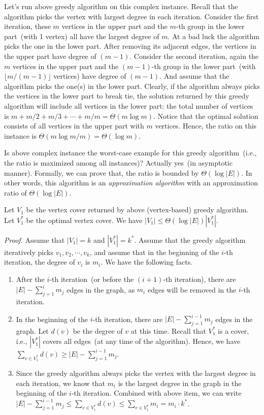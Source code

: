 Let's run above greedy algorithm on this complex instance.
Recall that the algorithm picks the vertex with largest degree in
each iteration. %
Consider the first iteration, 
these $m$ vertices in the upper part and the $m$-th group in the lower part~(with 1 vertex)
all have the largest degree of $m$.
At a bad luck the algorithm picks the one in the lower part.
After removing its adjacent edges, the vertices in the upper part
have degree of $(m-1)$.
Consider the second iteration,
again the $m$ vertices in the upper part and the $(m-1)$-th group in the lower part~(with $\lfloor m/(m-1) \rfloor$ vertices)
have degree of $(m-1)$.
And assume that the algorithm picks the one(s) in the lower part.
Clearly, if the algorithm always picks the vertices in the lower part
to break tie, the solution returned by this greedy algorithm will include all vertices in the lower part: the total
number of vertices is $m + m/2 + m/3 + \cdots + m/m = \Theta(m\log m)$.
Notice that the optimal solution consists of all vertices in the upper part with $m$ vertices.
Hence, the ratio on this instance is $\Theta(m\log m / m) = \Theta(\log m)$.

Is above complex instance the worst-case example for this greedy algorithm~(i.e.,
the ratio is maximized among all instances)?
Actually yes~(in asymptotic manner).
Formally, we can prove that, the ratio is bounded by $\Theta(\log |E|)$. In
other words, this algorithm is an \emph{approximation algorithm} with an approximation
ratio of $\Theta(\log |E|)$.
\begin{fact}
Let $V_1$ be the vertex cover returned by above (vertex-based) greedy algorithm.
Let $V_1^*$ be the optimal vertex cover.
We have $|V_1| \le \Theta(\log |E|) |V_1^*|$.
\end{fact}
\emph{Proof.}
Assume that $|V_1| = k$ and $|V_1^*| = k^*$.
Assume that the greedy algorithm iteratively picks $v_1, v_2, \cdots, v_k$,
and assume that in the beginning of the $i$-th iteration, the degree of $v_i$ is $m_i$.  We have the following facts.
\vspace*{-\topsep}
\begin{enumerate}
\item After the $i$-th iteration~(or before the $(i+1)$-th iteration),
there are $|E| - \sum_{j=1}^i m_j$ edges in the graph,
as $m_i$ edges will be removed in the $i$-th iteration.
\item In the beginning of the $i$-th iteration,
there are $|E| - \sum_{j=1}^{i-1} m_j$ edges in the graph.
Let $d(v)$ be the degree of $v$ at this time. 
Recall that $V_1^*$ is a cover, i.e., $|V_1^*|$ covers all edges~(at any time of the algorithm). 
Hence, we have $\sum_{v\in V_1^*} d(v) \ge |E| - \sum_{j=1}^{i-1} m_j$.
\item Since the greedy algorithm always picks the vertex
with the largest degree in each iteration, we know that $m_i$ is the largest 
degree in the graph in the beginning of the $i$-th iteration.
Combined with above item, we can write $|E| - \sum_{j=1}^{i-1} m_j \le \sum_{v\in V_1^*} d(v) \le \sum_{v\in V_1^*} m_i = m_i \cdot k^*$.
\end{enumerate}

